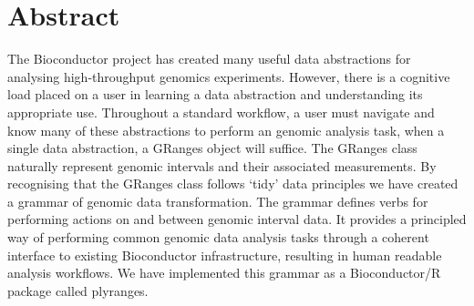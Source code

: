 \documentclass[10pt,letterpaper]{article}
\date{}
\newcommand{\getIndex}[2]{
  \ForEach{,}{\IfEq{#1}{\thislevelitem}{\number\thislevelcount\ExitForEach}{}}{#2}
}
\newcommand{\getAff}[1]{
  \getIndex{#1}{Monash University,Genentech}
}
\begin{document}
\vspace*{0.2in}

\section*{Abstract}
The Bioconductor project has created many useful data abstractions for
analysing high-throughput genomics experiments. However, there is a
cognitive load placed on a user in learning a data abstraction and
understanding its appropriate use. Throughout a standard workflow, a
user must navigate and know many of these abstractions to perform an
genomic analysis task, when a single data abstraction, a GRanges object
will suffice. The GRanges class naturally represent genomic intervals
and their associated measurements. By recognising that the GRanges class
follows `tidy' data principles we have created a grammar of genomic data
transformation. The grammar defines verbs for performing actions on and
between genomic interval data. It provides a principled way of
performing common genomic data analysis tasks through a coherent
interface to existing Bioconductor infrastructure, resulting in human
readable analysis workflows. We have implemented this grammar as a
Bioconductor/R package called plyranges.

\end{document}
